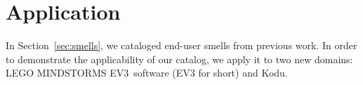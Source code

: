 \documentclass{sig-alternate}
\newcommand{\todo}[1]{\textbf{TODO: #1}}
\newcommand{\ms}{LEGO MINDSTORMS EV3}
\begin{document}





\section{Application}
\label{sec:application}
In Section~\ref{sec:smells}, we cataloged end-user smells from previous work. In order to demonstrate the applicability of our catalog, we apply it to two new domains: \ms~software (EV3 for short) and  Kodu. 
\end{document}
